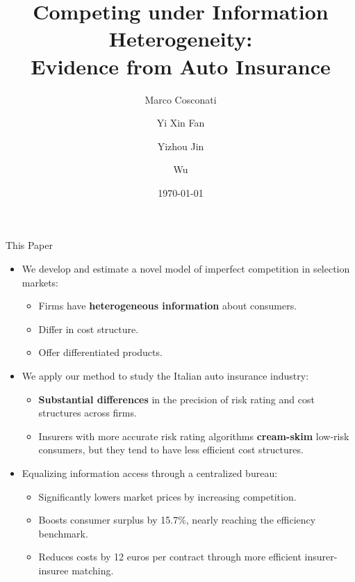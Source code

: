 \documentclass[10pt,aspectratio=169]{beamer}
\title[Competing under Information Heterogeneity]{Competing under Information Heterogeneity:\\ Evidence from Auto Insurance}
\author[Cosconati, Fan, Jin, Wu]{Marco Cosconati \and Yi Xin Fan \and Yizhou Jin \and Wu}
\institute{}
\date{\today}
\begin{document}
\begin{frame}
  \titlepage
\end{frame}



\begin{frame}{This Paper}

\begin{itemize}
    \item We develop and estimate a novel model of imperfect competition in selection markets:
    \begin{itemize}
        \item Firms have \textbf{heterogeneous information} about consumers.
        \item Differ in cost structure.
        \item Offer differentiated products.
    \end{itemize}
    \medskip %
    
    \item We apply our method to study the Italian auto insurance industry:
    \begin{itemize}
        \item \textbf{Substantial differences} in the precision of risk rating and cost structures across firms.
        \item Insurers with more accurate risk rating algorithms \textbf{cream-skim} low-risk consumers, but they tend to have less efficient cost structures.
    \end{itemize}
    \medskip
    
    \item Equalizing information access through a centralized bureau:
    \begin{itemize}
        \item Significantly lowers market prices by increasing competition.
        \item Boosts consumer surplus by 15.7\%, nearly reaching the efficiency benchmark.
        \item Reduces costs by 12 euros per contract through more efficient insurer-insuree matching.
    \end{itemize}
\end{itemize}

\end{frame}
\end{document}
